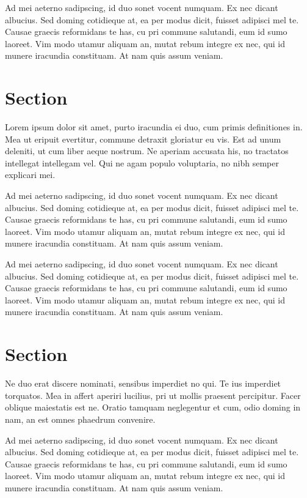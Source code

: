\documentclass[10pt,a4paper,twocolumn,german]{article}
\begin{document}
	Ad mei aeterno sadipscing, id duo sonet vocent numquam.
	Ex nec dicant albucius. Sed doming cotidieque at, ea per modus dicit, fuisset adipisci mel te.
	Causae graecis reformidans te has, cu pri commune salutandi, eum id sumo laoreet.
	Vim modo utamur aliquam an, mutat rebum integre ex nec, qui id munere iracundia constituam.
	At nam quis assum veniam.	
\section{Section}

	Lorem ipsum dolor sit amet, purto iracundia ei duo, cum primis definitiones in.
	Mea ut eripuit evertitur, commune detraxit gloriatur eu vis.
	Est ad unum deleniti, ut cum liber aeque nostrum.
	Ne aperiam accusata his, no tractatos intellegat intellegam vel.
	Qui ne agam populo voluptaria, no nibh semper explicari mei.
	
	Ad mei aeterno sadipscing, id duo sonet vocent numquam.
	Ex nec dicant albucius. Sed doming cotidieque at, ea per modus dicit, fuisset adipisci mel te.
	Causae graecis reformidans te has, cu pri commune salutandi, eum id sumo laoreet.
	Vim modo utamur aliquam an, mutat rebum integre ex nec, qui id munere iracundia constituam.
	At nam quis assum veniam.	
	
	Ad mei aeterno sadipscing, id duo sonet vocent numquam.
	Ex nec dicant albucius. Sed doming cotidieque at, ea per modus dicit, fuisset adipisci mel te.
	Causae graecis reformidans te has, cu pri commune salutandi, eum id sumo laoreet.
	Vim modo utamur aliquam an, mutat rebum integre ex nec, qui id munere iracundia constituam.
	At nam quis assum veniam.	

\section{Section}

	Ne duo erat discere nominati, sensibus imperdiet no qui.
	Te ius imperdiet torquatos.
	Mea in affert aperiri lucilius, pri ut mollis praesent percipitur.
	Facer oblique maiestatis est ne.
	Oratio tamquam neglegentur et cum, odio doming in nam, an est omnes phaedrum convenire.

	Ad mei aeterno sadipscing, id duo sonet vocent numquam.
	Ex nec dicant albucius. Sed doming cotidieque at, ea per modus dicit, fuisset adipisci mel te.
	Causae graecis reformidans te has, cu pri commune salutandi, eum id sumo laoreet.
	Vim modo utamur aliquam an, mutat rebum integre ex nec, qui id munere iracundia constituam.
	At nam quis assum veniam.	
\end{document}
